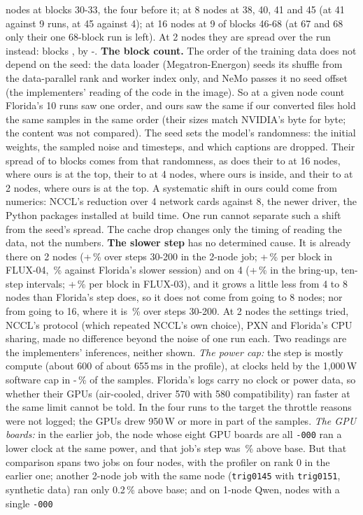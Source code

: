 nodes at blocks 30-33, the four before it; at 8 nodes at 38, 40, 41 and 45 (at 41 against 9 runs, at 45 against 4); at 16 nodes at 9 of blocks 46-68 (at 67 and 68 only their one 68-block run is left). At 2 nodes they are spread over the run instead: blocks \TriFxTwoAbove, by \TriFxTwoAboveLo-\TriFxTwoAboveHi. \textbf{The block count.} The order of the training data does not depend on the seed: the data loader (Megatron-Energon) seeds its shuffle from the data-parallel rank and worker index only, and NeMo passes it no seed offset (the implementers' reading of the code in the image). So at a given node count Florida's 10 runs saw one order, and ours saw the same if our converted files hold the same samples in the same order (their sizes match NVIDIA's byte for byte; the content was not compared). The seed sets the model's randomness: the initial weights, the sampled noise and timesteps, and which captions are dropped. Their spread of \TriFxFlBlocksLo{} to \TriFxFlBlocksHi{} blocks comes from that randomness, as does their \TriFxSixteenFlBlocksLo{} to \TriFxSixteenFlBlocksHi{} at 16 nodes, where ours is at the top, their \TriFxFourFlBlocksLo{} to \TriFxFourFlBlocksHi{} at 4 nodes, where ours is inside, and their \TriFxTwoFlBlocksLo{} to \TriFxTwoFlBlocksHi{} at 2 nodes, where ours is at the top. A systematic shift in ours could come from numerics: NCCL's reduction over 4 network cards against 8, the newer driver, the Python packages installed at build time. One run cannot separate such a shift from the seed's spread. The cache drop changes only the timing of reading the data, not the numbers. \textbf{The slower step} has no determined cause. It is already there on 2 nodes (+\TriFxGapPct\,\% over steps 30-200 in the 2-node job; +\TriFxTwoStepPct\,\% per block in FLUX-04, \TriFxTwoStepPctSlow\,\% against Florida's slower session) and on 4 (+\TriFxGapFour\,\% in the bring-up, ten-step intervals; +\TriFxFourStepPct\,\% per block in FLUX-03), and it grows a little less from 4 to 8 nodes than Florida's step does, so it does not come from going to 8 nodes; nor from going to 16, where it is \TriFxSixteenTenPct\,\% over steps 30-200. At 2 nodes the settings tried, NCCL's protocol (which repeated NCCL's own choice), PXN and Florida's CPU sharing, made no difference beyond the noise of one run each. Two readings are the implementers' inferences, neither shown. \textit{The power cap:} the step is mostly compute (about 600 of about 655\,ms in the profile), at clocks held by the 1,000\,W software cap in \TriFxGapCapLo-\TriFxGapCapHi\,\% of the samples. Florida's logs carry no clock or power data, so whether their GPUs (air-cooled, driver 570 with 580 compatibility) ran faster at the same limit cannot be told. In the four runs to the target the throttle reasons were not logged; the GPUs drew 950\,W or more in part of the samples. \textit{The GPU boards:} in the earlier job, the node whose eight GPU boards are all \texttt{-000} ran a lower clock at the same power, and that job's step was \TriFxGapOneAbove\,\% above base. But that comparison spans two jobs on four nodes, with the profiler on rank 0 in the earlier one; another 2-node job with the same node (\texttt{trig0145} with \texttt{trig0151}, synthetic data) ran only 0.2\,\% above base; and on 1-node Qwen, nodes with a single \texttt{-000} 